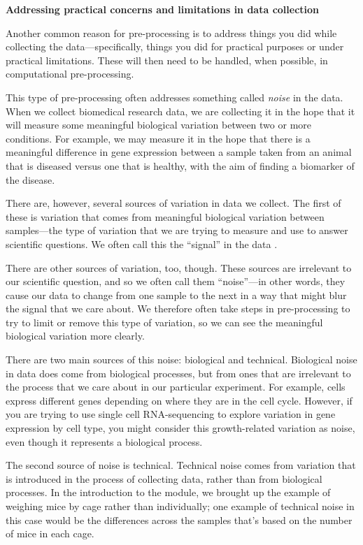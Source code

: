 \documentclass[]{tufte-book}
\begin{document}
\textbf{Addressing practical concerns and limitations in data collection}

Another common reason for pre-processing is to address things you
did while collecting the data---specifically, things you did for
practical purposes or under practical limitations. These will then need to
be handled, when possible, in computational pre-processing.

This type of pre-processing often addresses something called
\emph{noise} in the data. When we collect biomedical
research data, we are collecting it in the hope that it will measure
some meaningful biological variation between two or more conditions. For
example, we may measure it in the hope that there is a meaningful difference in
gene expression between a sample taken from an animal that is diseased versus
one that is healthy, with the aim of finding a biomarker of the disease.

There are, however, several sources of variation in data we collect. The first
of these is variation that comes from meaningful biological variation between
samples---the type of variation that we are trying to measure and
use to answer scientific questions. We often call this the ``signal'' in the
data \citep{chatfield1995problem}.

There are other sources of variation, too, though. These sources are irrelevant to
our scientific question, and so we often call them ``noise''---in other words,
they cause our data to change from one sample to the next in a way that might
blur the signal that we care about. We therefore often take steps in
pre-processing to try to limit or remove this type of variation, so we can see the
meaningful biological variation more clearly.

There are two main sources of this noise: biological and technical. Biological
noise in data does come from biological processes, but from ones that are
irrelevant to the process that we care about in our particular experiment. For
example, cells express different genes depending on where they are in the cell
cycle. However, if you are trying to use single cell RNA-sequencing to explore
variation in gene expression by cell type, you might consider this
growth-related variation as noise, even though it represents a biological
process.

The second source of noise is technical. Technical noise comes from variation
that is introduced in the process of collecting data, rather than from
biological processes. In the introduction to the module, we brought up the
example of weighing mice by cage rather than individually; one example of
technical noise in this case would be the differences across the samples that's
based on the number of mice in each cage.
\end{document}
